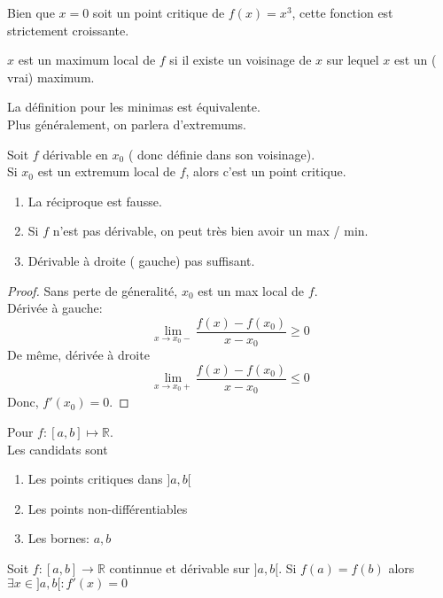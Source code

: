 \documentclass[../main.tex]{subfiles}
\begin{document}
\begin{rmq}
	Bien que $x=0$ soit un point critique de $f( x) =x^{3}$, cette fonction est strictement croissante.
\end{rmq}
\begin{defn}
	$x$ est un maximum local de $f$ si il existe un voisinage de $x$ sur lequel $x$ est un ( vrai) maximum.
\end{defn}
La définition pour les minimas est équivalente.\\
Plus généralement, on parlera d'extremums.
\begin{propo}
	Soit $f$ dérivable en $x_0$ ( donc définie dans son voisinage).\\
	Si $x_0$ est un extremum local de $f$, alors c'est un point critique.
\end{propo}
\begin{rmq}
\begin{enumerate}
\item La réciproque est fausse.
\item Si $f$ n'est pas dérivable, on peut très bien avoir un max / min.
\item Dérivable à droite ( gauche) pas suffisant.
\end{enumerate}
\end{rmq}
\begin{proof}
Sans perte de géneralité, $x_0$ est un max local de $f$.\\
Dérivée à gauche:
\[ 
	\lim_{x \to x_0-}  \frac{f( x) - f( x_0) }{x-x_0} \geq 0
\]
De même, dérivée à droite
\[ 
	\lim_{x \to x_0+}  \frac{f( x) - f( x_0) }{x-x_0} \leq 0
\]
Donc, $f'( x_0) = 0$.
\end{proof}
\begin{propo}
	Pour $f:[a,b] \mapsto \mathbb{R}$.\\
	Les candidats sont
	\begin{enumerate}
		\item Les points critiques dans $] a,b[$ 
		\item Les points non-différentiables
		\item Les bornes: $a,b$
	\end{enumerate}
	
	

\end{propo}
\begin{thm}\label{thm:theoreme_de_rolle}
	Soit $f: [ a,b] \to \mathbb{R}$ continnue et dérivable sur $]a,b[$.
	Si $f( a) = f( b) $ alors $\exists x \in ]a,b[: f'( x) = 0$ 
	
\end{thm}
\end{document}
